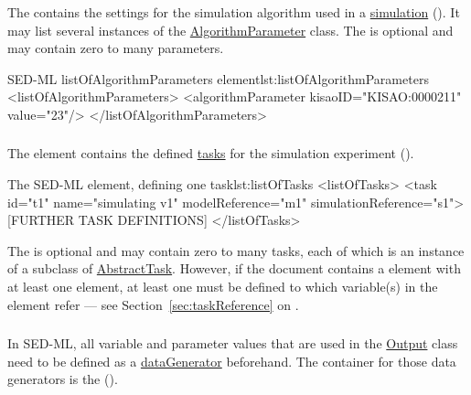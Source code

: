\subsubsection{}
\label{sec:listOfAlgorithmParameters}
The  contains the settings for the simulation algorithm used in a \hyperref[class:simulation]{simulation} (). It may list several instances of the \hyperref[class:algorithmParameter]{AlgorithmParameter} class. The  is optional and may contain zero to many parameters.

\begin{myXmlLst}{SED-ML listOfAlgorithmParameters element}{lst:listOfAlgorithmParameters}
<listOfAlgorithmParameters>
	<algorithmParameter kisaoID="KISAO:0000211" value="23"/> 
</listOfAlgorithmParameters>
\end{myXmlLst}

 
\subsubsection{}
\label{sec:listOfTasks}
The  element contains the defined \hyperref[class:task]{tasks} for the simulation experiment ().


\begin{myXmlLst}{The SED-ML  element, defining one task}{lst:listOfTasks}
<listOfTasks>
	<task id="t1" name="simulating v1" modelReference="m1" simulationReference="s1">
	[FURTHER TASK DEFINITIONS]
</listOfTasks>
\end{myXmlLst}

The  is optional and may contain zero to many tasks, each of which is an instance of a subclass of \hyperref[class:abstractTask]{AbstractTask}. However, if the \currentLV document contains a  element with at least one  element, at least one  must be defined to which variable(s) in the  element refer --- see Section~\ref{sec:taskReference} on .


\subsubsection{}
\label{sec:listOfDataGenerators}
In SED-ML, all variable and parameter values that are used in the \hyperref[class:output]{Output} class need to be defined as a \hyperref[class:dataGenerator]{dataGenerator} beforehand. The container for those data generators is the  ().

